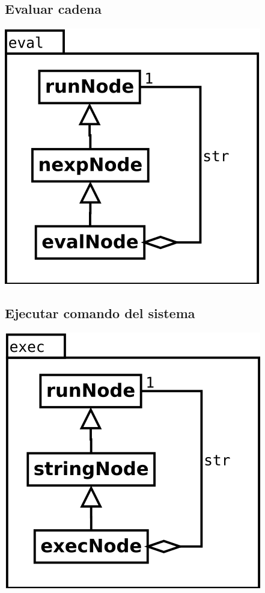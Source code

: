 \subsection {Evaluar cadena} 
\begin{center}
\includegraphics[scale=0.4]{eval.png} \\
\end{center}

\subsection {Ejecutar comando del sistema} 
\begin{center}
\includegraphics[scale=0.4]{exec.png} \\
\end{center}

